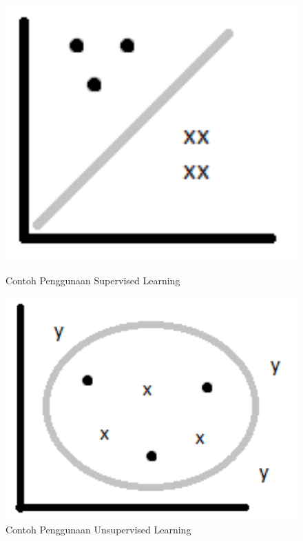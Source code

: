 \begin{enumerate}
\begin{figure}
\centerline{\includegraphics[width=1\textwidth]{figures/fathi/chapter2/2.PNG}}
\caption{Contoh Penggunaan Supervised Learning}
\label{a2}

\centerline{\includegraphics[width=1\textwidth]{figures/fathi/chapter2/3.PNG}}
\caption{Contoh Penggunaan Unsupervised Learning}
\label{a3}


\end{figure}
\end{enumerate}
